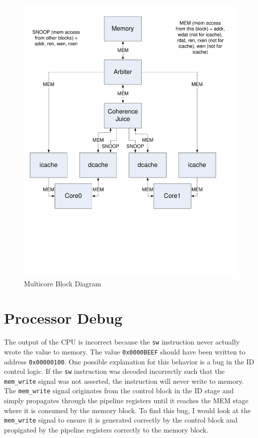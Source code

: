 \documentclass[12pt]{article}
\begin{document}
\begin{figure}
	\begin{center}
		\includegraphics[width=7in]{multicore}
	\end{center}
	\caption{Multicore Block Diagram}
	\label{fig:dcache}
\end{figure}

\newpage

\newpage
\section{Processor Debug}

The output of the CPU is incorrect  because the \texttt{sw} instruction never actually wrote the value to memory.  The value \texttt{0x0000BEEF} should have been written to address \texttt{0x00000100}. One possible explanation for this behavior is a bug in the ID control logic. If the \texttt{sw} instruction was decoded incorrectly such that the \texttt{mem\_write} signal was not asserted, the instruction will never write to memory. The \texttt{mem\_write} signal originates from the control block in the ID stage and simply propagates through the pipeline registers until it reaches the MEM stage where it is consumed by the memory block. To find this bug, I would look at the \texttt{mem\_write} signal to ensure it is generated correctly by the control block and propigated by the pipeline registers correctly to the memory block.\\
\end{document}
